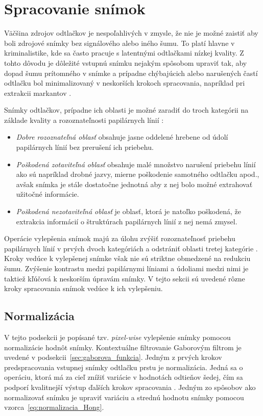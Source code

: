   \section{Spracovanie snímok}\label{sec:spracovanie_snimok}
  Väčšina zdrojov odtlačkov je nespoľahlivých v zmysle, že nie je možné zaistiť aby boli zdrojové snímky bez signálového alebo iného šumu.
  To platí hlavne v kriminalistike,
  kde sa často pracuje s latentnými odtlačkami nízkej kvality. Z tohto dôvodu je dôležité vstupnú snímku nejakým spôsobom upraviť tak,
  aby dopad šumu prítomného v snímke a prípadne chýbajúcich alebo narušených častí odtlačku bol minimalizovaný v neskorších krokoch spracovania,
  napríklad pri extrakcii markantov \cite{Handbook}.

  Snímky odtlačkov, prípadne ich oblasti je možné zaradiť do troch kategórii na základe kvality a rozoznateľnosti papilárnych línií \cite{Hong}:
  \begin{itemize}
    \item \emph{Dobre rozoznateľná oblasť} obsahuje jasne oddelené hrebene od údolí papilárnych línií bez prerušení ich priebehu.
    \item \emph{Poškodená zotaviteľná oblasť} obsahuje malé množstvo narušení priebehu línií ako sú napríklad drobné jazvy, mierne poškodenie
          samotného odtlačku apod., avšak snímka je stále dostatočne jednotná aby z nej bolo možné extrahovať užitočné informácie.
    \item \emph{Poškodená nezotaviteľná oblasť} je oblasť, ktorá je natoľko poškodená, že extrakcia informácií o štruktúrach papilárnych línií
          z nej nemá zmysel.
  \end{itemize}
  Operácie vylepšenia snímok majú za úlohu zvýšiť rozoznateľnosť priebehu papilárnych línií v prvých dvoch kategóriách a odstrániť oblasti tretej
  kategórie \cite{Hong}.
  Kroky vedúce k vylepšenej snímke však nie sú striktne obmedzené na redukciu šumu. Zvýšenie kontrastu medzi papilárnymi líniami a údoliami medzi nimi
  je taktiež kľúčová k neskorším úpravám snímky. V tejto sekcii sú uvedené rôzne kroky spracovania snímok vedúce k ich vylepšeniu.

  \subsection{Normalizácia} \label{sec:normalizacia}
  V tejto podsekcii je popísané tzv. \emph{pixel-wise} vylepšenie snímky pomocou normalizácie hodnôt snímky. Kontextuálne filtrovanie Gaborovým
  filtrom je uvedené v podsekcii~{\ref{sec:gaborova_funkcia}}.
  Jedným z prvých krokov predspracovania vstupnej snímky odtlačku prstu je normalizácia. Jedná sa o operáciu, ktorá má za cieľ znížiť variácie
  v hodnotách odtieňov šedej, čím sa podporí kvalitnejší výstup ďalších krokov spracovania \cite{Hong}. Jedným zo spôsobov ako normalizovať
  snímku je upraviť variáciu a strednú hodnotu snímky pomocou vzorca~{\ref{eq:normalizacia_Hong}}.

